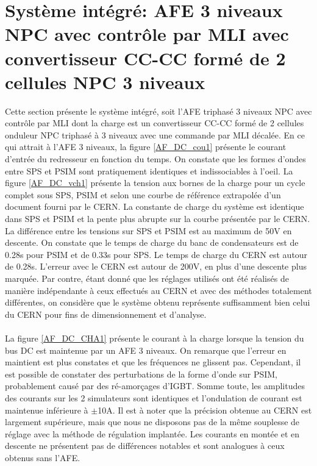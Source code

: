 \clearpage
\section{Système intégré: AFE 3 niveaux NPC avec contrôle par MLI avec convertisseur CC-CC formé de 2 cellules NPC 3 niveaux}
Cette section présente le système intégré, soit l'AFE triphasé 3 niveaux NPC avec contrôle par MLI dont la charge est un convertisseur CC-CC formé de 2 cellules onduleur NPC triphasé à 3 niveaux avec une commande par MLI décalée. En ce qui attrait à l'AFE 3 niveaux, la figure \ref{AF_DC_cou1} présente le courant d'entrée du redresseur en fonction du temps. On constate que les formes d'ondes entre SPS et PSIM sont pratiquement identiques et indissociables à l'oeil. La figure \ref{AF_DC_vch1} présente la tension aux bornes de la charge pour un cycle complet sous SPS, PSIM  et selon une courbe de référence extrapolée d'un document fourni par le CERN. La constante de charge du système est identique dans SPS et PSIM et la pente plus abrupte sur la courbe présentée par le CERN. La différence entre les tensions sur SPS et PSIM est au maximum de 50V en descente. On constate que le temps de charge du banc de condensateurs est de 0.28s pour PSIM et de 0.33s pour SPS. Le temps de charge du CERN est autour de 0.28s. L'erreur avec le CERN est autour de 200V, en plus d'une descente plus marquée. Par contre, étant donné que les réglages utilisés ont été réalisés de manière indépendante à ceux effectués au CERN et avec des méthodes totalement différentes, on considère que le système obtenu représente suffisamment bien celui du CERN pour fins de dimensionnement et d'analyse.

\paragraph{}La figure \ref{AF_DC_CHA1} présente le courant à la charge lorsque la tension du bus DC est maintenue par un AFE 3 niveaux. On remarque que l'erreur en maintient est plus constates et que les fréquences ne glissent pas. Cependant, il est possible de constater des perturbations de la forme d'onde sur PSIM, probablement causé par des ré-amorçages d'IGBT. Somme toute, les amplitudes des courants sur les 2 simulateurs sont identiques et l'ondulation  de courant est maintenue inférieure à $\pm$10A. Il est à noter que la précision obtenue au CERN est largement supérieure, mais que nous ne disposons pas de la même souplesse de réglage avec la méthode de régulation implantée. Les courants en montée  et en descente ne présentent pas de différences notables et sont analogues à ceux obtenus sans l'AFE.

